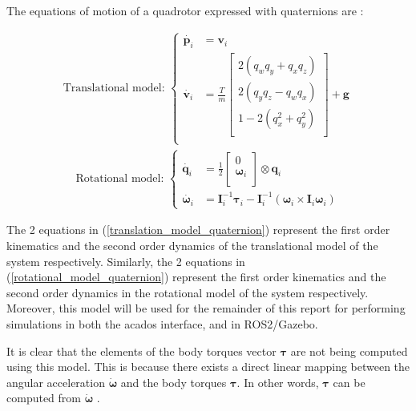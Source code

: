 \documentclass{thesisreport}
\begin{document}
The equations of motion of a quadrotor expressed with quaternions are \cite{Erskine2021}:

				\begin{align}\label{translation_model_quaternion}
					\text{Translational model: }\left\{
					\begin{array}{ll}				
					\dot{\bm{p}_i} &= \bm{v}_i \\
					\dot{\bm{v}_i} &= 
					\frac{T}{m} 
					\begin{bmatrix}
						2 (q_w q_y + q_x q_z) \\
						2 (q_y q_z - q_w q_x) \\
						1 - 2(q_x^2 + q_y^2 ) \\
					\end{bmatrix} + \bm{g} \\	
					\end{array}
					\right.
				\end{align}
				\begin{align}\label{rotational_model_quaternion}
			\text{Rotational model: }\left\{
			\begin{array}{ll}		
					\dot{\bm{q}_i} & = \frac{1}{2}
					\begin{bmatrix}
						0 \\
						\bm{\omega}_i \\
					\end{bmatrix} \otimes \bm{q}_i \\
					\dot{\bm{\omega}_i} &= \bm{I}_i^{-1} \bm{\tau}_i - \bm{I}_i^{-1} (\bm{\omega}_i \times \bm{I}_i \bm{\omega}_i)
			\end{array}
			\right.
				\end{align}
			
The 2 equations in (\ref{translation_model_quaternion}) represent the first order kinematics and the second order dynamics of the translational model of the system respectively. Similarly, the 2 equations in (\ref{rotational_model_quaternion}) represent the first order kinematics and the second order dynamics in the rotational model of the system respectively. 
Moreover, this model will be used for the remainder of this report for performing simulations in both the acados interface, and in ROS2/Gazebo. 

It is clear that the elements of the body torques vector $\bm{\tau}$ are not being computed using this model. This is because there exists a direct linear mapping between the angular acceleration $\bm{\dot{\bm{\omega}}}$ and the body torques $\bm{\tau}$. In other words, $\bm{\tau}$ can be computed from $\bm{\dot{\bm{\omega}}}$ .
\end{document}
